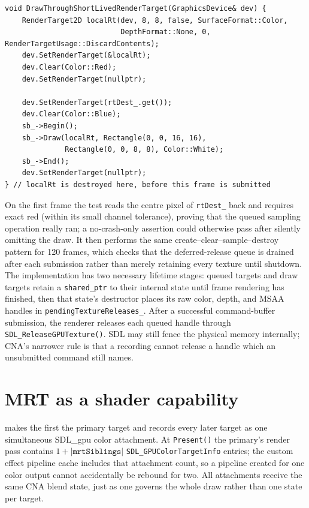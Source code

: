 \begin{lstlisting}
void DrawThroughShortLivedRenderTarget(GraphicsDevice& dev) {
    RenderTarget2D localRt(dev, 8, 8, false, SurfaceFormat::Color,
                           DepthFormat::None, 0, RenderTargetUsage::DiscardContents);
    dev.SetRenderTarget(&localRt);
    dev.Clear(Color::Red);
    dev.SetRenderTarget(nullptr);

    dev.SetRenderTarget(rtDest_.get());
    dev.Clear(Color::Blue);
    sb_->Begin();
    sb_->Draw(localRt, Rectangle(0, 0, 16, 16),
              Rectangle(0, 0, 8, 8), Color::White);
    sb_->End();
    dev.SetRenderTarget(nullptr);
} // localRt is destroyed here, before this frame is submitted
\end{lstlisting}

On the first frame the test reads the centre pixel of \texttt{rtDest\_} back and requires exact
red (within its small channel tolerance), proving that the queued sampling operation really
ran; a no-crash-only assertion could otherwise pass after silently omitting the draw. It then
performs the same create--clear--sample--destroy pattern for 120 frames, which checks that the
deferred-release queue is drained after each submission rather than merely retaining every
texture until shutdown. The implementation has two necessary lifetime stages: queued targets
and draw targets retain a \texttt{shared\_ptr} to their internal state until frame rendering has
finished, then that state's destructor places its raw color, depth, and MSAA handles in
\texttt{pendingTextureReleases\_}. After a successful command-buffer submission, the renderer
releases each queued handle through \texttt{SDL\_ReleaseGPUTexture()}. SDL may still fence the
physical memory internally; CNA's narrower rule is that a recording cannot release a handle
which an unsubmitted command still names.

\section{MRT as a shader capability}

 makes the first
 the primary target and records every later target as one simultaneous
SDL\_gpu color attachment. At \texttt{Present()} the primary's render pass contains
\(1+\lvert\texttt{mrtSiblings}\rvert\) \texttt{SDL\_GPUColorTargetInfo} entries; the custom
effect pipeline cache includes that attachment count, so a pipeline created for one color output
cannot accidentally be rebound for two. All attachments receive the same CNA blend state, just
as one  governs the whole draw rather than one state per
target.

